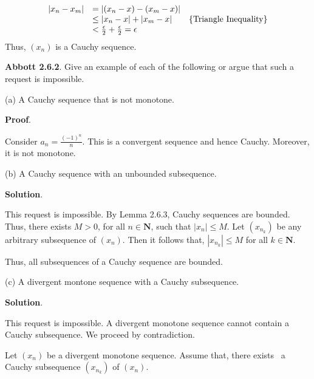 \documentclass[10pt]{article}
\begin{document}
\begin{equation*}
\begin{array}{ c l c }
|x_{n} -x_{m} | & =|( x_{n} -x) -( x_{m} -x) | & \\
 & \leq |x_{n} -x|+|x_{m} -x| & \left\{\text{Triangle Inequality}\right\}\\
 & < \frac{\epsilon }{2} +\frac{\epsilon }{2} =\epsilon  & 
\end{array}
\end{equation*}
Thus, $\displaystyle ( x_{n})$ is a Cauchy sequence.



\textbf{Abbott 2.6.2}. Give an example of each of the following or argue that such a request is impossible.



(a) A Cauchy sequence that is not monotone.



\textbf{Proof}.

Consider $\displaystyle a_{n} =\frac{( -1)^{n}}{n}$. This is a convergent sequence and hence Cauchy. Moreover, it is not monotone.



(b) A Cauchy sequence with an unbounded subsequence. 

\textbf{Solution}.



This request is impossible. By Lemma 2.6.3, Cauchy sequences are bounded. Thus, there exists $\displaystyle M >0$, for all $\displaystyle n\in \mathbf{N}$, such that $\displaystyle |x_{n} |\leq M$. Let $\displaystyle ( x_{n_{k}})$ be any arbitrary subsequence of $\displaystyle ( x_{n})$. Then it follows that, $\displaystyle |x_{n_{k}} |\leq M$ for all $\displaystyle k\in \mathbf{N}$.



Thus, all subsequences of a Cauchy sequence are bounded.



(c) A divergent montone sequence with a Cauchy subsequence.



\textbf{Solution}.



This request is impossible. A divergent monotone sequence cannot contain a Cauchy subsequence. We proceed by contradiction.



Let $\displaystyle ( x_{n})$ be a divergent monotone sequence. Assume that, there exists \ a Cauchy subsequence $\displaystyle ( x_{n_{k}})$ of $\displaystyle ( x_{n})$. 
\end{document}
